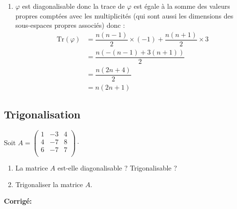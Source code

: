 \documentclass[a4paper,twoside,french,10pt]{VcCours}
\newcommand{\corr}{\textbf{Corrigé:}}
\begin{document}
\begin{enumerate}
\item $\varphi$ est diagonalisable donc la trace de $\varphi$ est égale à la somme des valeurs propres comptées avec les multiplicités (qui sont aussi les dimensions des sous-espaces propres associés) donc :
\begin{align*}
\textrm{Tr}(\varphi)& = \dfrac{n(n-1)}{2} \times (-1) + \dfrac{n(n+1)}{2} \times 3  \\
& = \dfrac{n(-(n-1)+3(n+1))}{2} \\
& = \dfrac{n(2n+4)}{2} \\
& = n(2n+1) 
\end{align*}
\end{enumerate}




\subsection{Trigonalisation}


\begin{Exercice}{} Soit $A= \begin{pmatrix}
1 & -3 & 4 \\
4 & -7 & 8 \\
6 & -7 & 7 \\
\end{pmatrix}\cdot$

\begin{enumerate}
\item La matrice $A$ est-elle diagonalisable ? Trigonalisable ?
\item Trigonaliser la matrice $A$. 
\end{enumerate}
\end{Exercice}

\corr 
\end{document}
